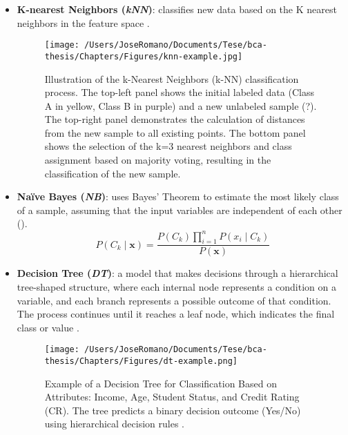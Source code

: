 \begin{itemize}
  \item \textbf{K-nearest Neighbors (\textit{kNN})}: classifies new data based on the K nearest neighbors in the feature space \cite{knn_article}.
        \begin{figure} [h]
          \centering
          \texttt{[image: /Users/JoseRomano/Documents/Tese/bca-thesis/Chapters/Figures/knn-example.jpg]}
          \caption{Illustration of the k-Nearest Neighbors (k-NN) classification process. The top-left panel shows the initial labeled data (Class A in yellow, Class B in purple) and a new unlabeled sample (?). The top-right panel demonstrates the calculation of distances from the new sample to all existing points. The bottom panel shows the selection of the k=3 nearest neighbors and class assignment based on majority voting, resulting in the classification of the new sample.}
        \end{figure}

  \item \textbf{Naïve Bayes (\textit{NB})}: uses Bayes' Theorem to estimate the most likely class of a sample, assuming that the input variables are independent of each other (\cite{naivebayes_Watson2001}).
        \[
          P(C_k \mid \mathbf{x}) = \frac{P(C_k) \prod_{i=1}^n P(x_i \mid C_k)}{P(\mathbf{x})}
        \]

  \item \textbf{Decision Tree (\textit{DT})}: a model that makes decisions through a hierarchical tree-shaped structure, where each internal node represents a condition on a variable, and each branch represents a possible outcome of that condition. The process continues until it reaches a leaf node, which indicates the final class or value \cite{decision_trees_Jijo2021}.
        \begin{figure} [h]
          \centering
          \texttt{[image: /Users/JoseRomano/Documents/Tese/bca-thesis/Chapters/Figures/dt-example.png]}
          \caption{Example of a Decision Tree for Classification Based on Attributes: Income, Age, Student Status, and Credit Rating (CR). The tree predicts a binary decision outcome (Yes/No) using hierarchical decision rules \cite{decision_trees_Jijo2021Classification}.}
        \end{figure}


\end{itemize}
